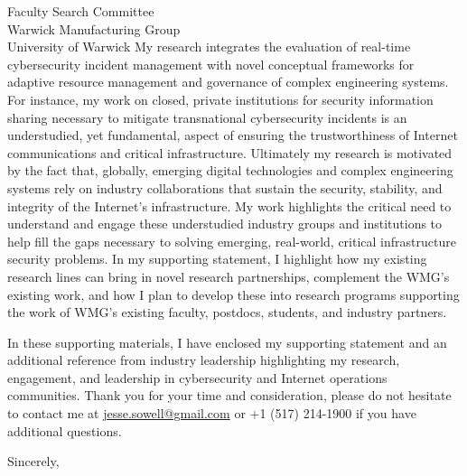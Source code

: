 \documentclass[11pt]{letter}
\begin{document}
\begin{letter}{ Faculty Search Committee \\
                Warwick Manufacturing Group \\
                University of Warwick                 
              }
My research integrates 
the evaluation of real-time cybersecurity incident management 
with novel conceptual frameworks for adaptive
resource management and governance of complex engineering systems. 
%
For instance, my work on closed, private institutions for security information sharing necessary to mitigate transnational cybersecurity incidents is an understudied, yet fundamental, aspect of ensuring the trustworthiness of Internet communications and critical infrastructure.
%
Ultimately my research is motivated by the fact that, globally,
emerging digital technologies and complex engineering systems rely on industry collaborations that sustain the
security, stability, and integrity of the Internet's
infrastructure.  My work highlights the critical need to understand and engage these
understudied industry groups and institutions to help fill the gaps necessary to solving emerging, real-world, critical infrastructure security problems. 
%
%
In my supporting statement, I highlight how my existing research lines can bring in novel research partnerships, complement the WMG's existing work, and how I plan to develop these into research programs supporting the work of WMG's existing faculty, postdocs, students, and industry partners. 

In these supporting materials, I have enclosed my supporting statement and an additional reference from industry leadership highlighting my research, engagement, and leadership in cybersecurity and Internet operations communities.
%
Thank you for your time and consideration, please do not hesitate to contact me at \href{mailto:jesse.sowell@gmail.com}{jesse.sowell@gmail.com} or +1 (517) 214-1900 if you have additional questions.


\closing{Sincerely,}


\end{letter}
\end{document}
